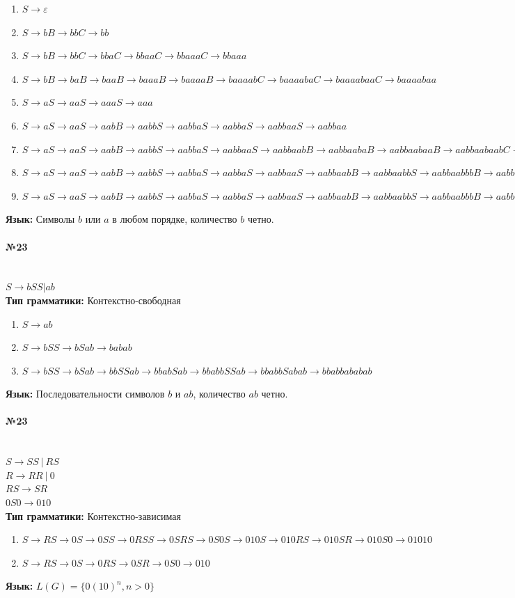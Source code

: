 \documentclass[12pt,onecolumn]{article}
\newcommand{\nparagraph}[1]{\paragraph{#1}\mbox{}\\}
\begin{document}
\begin{enumerate}
    \item $S \to \varepsilon$
    \item $S \to bB \to bbC \to bb$
    \item $S \to bB \to bbC \to bbaC \to bbaaC \to bbaaaC \to bbaaa$
    \item $S \to bB \to baB \to baaB \to baaaB \to baaaaB \to baaaabC \to baaaabaC \to baaaabaaC \to baaaabaa$
    \item $S \to aS \to aaS \to aaaS \to aaa$
    \item $S \to aS \to aaS \to aabB \to aabbS \to aabbaS \to aabbaS \to aabbaaS \to aabbaa$
    \item $S \to aS \to aaS \to aabB \to aabbS \to aabbaS \to aabbaaS \to aabbaabB\to aabbaabaB \to aabbaabaaB \to aabbaabaabC \to aabbaabaab$
    \item $S \to aS \to aaS \to aabB \to aabbS \to aabbaS \to aabbaS \to aabbaaS \to aabbaabB \to aabbaabbS \to aabbaabbbB \to aabbaabbbbC \to aabbaabbbb$
    \item $S \to aS \to aaS \to aabB \to aabbS \to aabbaS \to aabbaS \to aabbaaS \to aabbaabB \to aabbaabbS \to aabbaabbbB \to aabbaabbbbC \to aabbaabbbbaC \to aabbaabbbbaaC \to aabbaabbbbaaaC \to aabbaabbbbaaa$
\end{enumerate}
\textbf{Язык:} Символы $b$ или $a$ в любом порядке, количество $b$ четно. 
\nparagraph{№23}
$S \to bSS | ab$\\
\textbf{Тип грамматики: } Контекстно-свободная
\begin{enumerate}
    \item $S \to ab$
    \item $S \to bSS \to bSab \to babab$
    \item $S \to bSS \to bSab \to bbSSab \to bbabSab \to bbabbSSab \to bbabbSabab \to bbabbababab$
\end{enumerate}
\textbf{Язык: } Последовательности символов $b$ и $ab$, количество $ab$ четно.
\nparagraph{№23} 
$S \to SS~ |~ RS$\\
$R \to RR~ |~ 0$\\
$RS \to SR$\\
$0S0 \to 010$\\
\textbf{Тип грамматики: } Контекстно-зависимая\\
\begin{enumerate}
    \item $S \to RS \to 0S \to 0SS\to 0RSS\to 0SRS \to 0S0S \to 010S \to 010RS \to 010SR \to 010S0 \to 01010$
    \item $S \to RS \to 0S \to 0RS\to 0SR \to 0S0 \to 010$
\end{enumerate}
\textbf{Язык: }  $L(G) = \{0(10)^n, n > 0\}$
\end{document}
